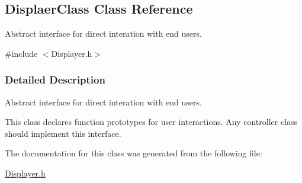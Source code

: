\hypertarget{class_displaer_class}{\subsection{Displaer\+Class Class Reference}
\label{class_displaer_class}
}


Abstract interface for direct interation with end users.  




{\ttfamily \#include $<$Displayer.\+h$>$}



\subsubsection{Detailed Description}
Abstract interface for direct interation with end users. 

This class declares function prototypes for user interactions. Any controller class should implement this interface. 

The documentation for this class was generated from the following file\+:\begin{DoxyCompactItemize}
\item 
\hyperlink{_displayer_8h}{Displayer.\+h}\end{DoxyCompactItemize}
